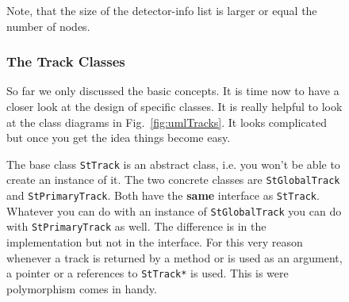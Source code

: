 \documentclass[twoside]{article}
\begin{document}
\begin{figure}[htb]
\begin{center}
Note, that the size of the detector-info list is larger or equal the
number of nodes.

\subsubsection{The Track Classes}

So far we only discussed the basic concepts. It is time now to have a
closer look at the design of specific classes. It is really helpful to
look at the class diagrams in Fig.~\ref{fig:umlTracks}. It looks
complicated but once you get the idea things become easy.

The base class \texttt{StTrack} is an abstract class, i.e. you won't
be able to create an instance of it. The two concrete classes are
\texttt{StGlobalTrack} and \texttt{StPrimaryTrack}.  Both have the
\textbf{same} interface as \texttt{StTrack}. Whatever you can do with
an instance of \texttt{StGlobalTrack} you can do with
\texttt{StPrimaryTrack} as well. The difference is in the
implementation but not in the interface. For this very reason whenever
a track is returned by a method or is used as an argument, a pointer
or a references to \texttt{StTrack*} is used. This is were
polymorphism comes in handy.


\end{center}
\end{figure}
\end{document}

